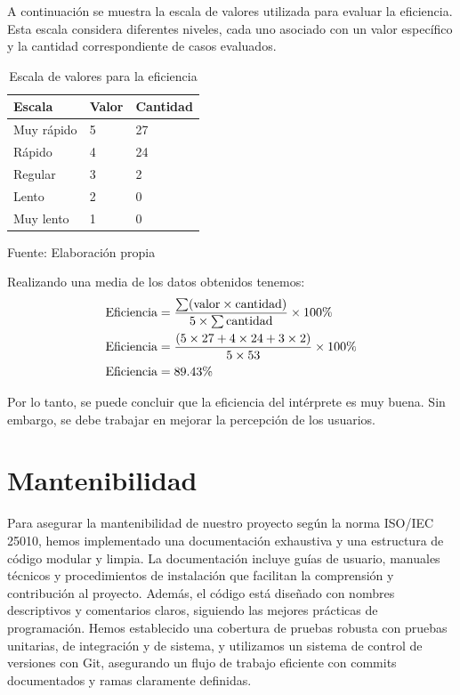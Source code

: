 A continuación se muestra la escala de valores utilizada para evaluar la eficiencia. Esta escala considera diferentes niveles, cada uno asociado con un valor específico y la cantidad correspondiente de casos evaluados.

\begin{table}[!h]
  \begin{center}
    \begin{tabularx}{0.9\textwidth}{|X|X|X|}
      \hline
      \textbf{Escala} & \textbf{Valor} & \textbf{Cantidad} \\
      \hline
      Muy rápido & 5 & 27 \\
      \hline
      Rápido & 4 & 24 \\
      \hline
      Regular & 3 & 2 \\
      \hline
      Lento & 2 & 0 \\
      \hline
      Muy lento & 1 & 0 \\
      \hline
    \end{tabularx}
  \end{center}
  \caption{Escala de valores para la eficiencia}
  \centering Fuente: Elaboración propia
  \label{tab:eficiencia-escala}
\end{table}

Realizando una media de los datos obtenidos tenemos:
\begin{equation*}
  \begin{split}
    \textnormal{Eficiencia} & = \frac{\sum (\textnormal{valor} \times \textnormal{cantidad})}{5 \times \sum \textnormal{cantidad}} \times 100\% \\
    \textnormal{Eficiencia} & = \frac{(5 \times 27 + 4 \times 24 + 3 \times 2)}{5 \times 53} \times 100\% \\
    \textnormal{Eficiencia} & = 89.43\%
  \end{split}
\end{equation*}

Por lo tanto, se puede concluir que la eficiencia del intérprete es muy buena. Sin embargo, se debe trabajar en mejorar la percepción de los usuarios.

\section{Mantenibilidad}
Para asegurar la mantenibilidad de nuestro proyecto según la norma ISO/IEC 25010, hemos implementado una documentación exhaustiva y una estructura de código modular y limpia. La documentación incluye guías de usuario, manuales técnicos y procedimientos de instalación que facilitan la comprensión y contribución al proyecto. Además, el código está diseñado con nombres descriptivos y comentarios claros, siguiendo las mejores prácticas de programación. Hemos establecido una cobertura de pruebas robusta con pruebas unitarias, de integración y de sistema, y utilizamos un sistema de control de versiones con Git, asegurando un flujo de trabajo eficiente con commits documentados y ramas claramente definidas.

